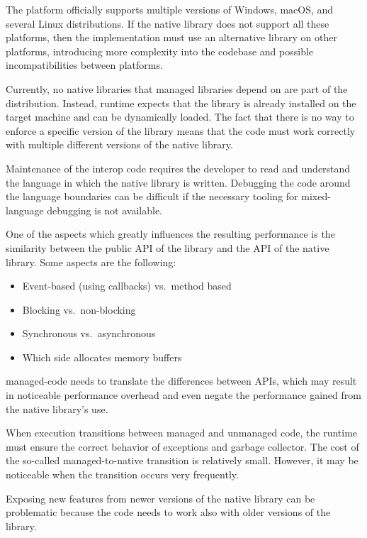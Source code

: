 \begin{itemize}

     The \dotnet{} platform officially supports
    multiple versions of Windows, macOS, and several Linux distributions. If the native library does
    not support all these platforms, then the implementation must use an alternative library on
    other platforms, introducing more complexity into the codebase and possible incompatibilities
    between platforms.

     Currently, no native libraries that managed
    \dotnet{} libraries depend on are part of the \dotnet{} distribution. Instead, \dotnet{} runtime
    expects that the library is already installed on the target machine and can be dynamically
    loaded. The fact that there is no way to enforce a specific version of the library means that
    the \dotnet{} code must work correctly with multiple different versions of the native library.

     Maintenance of the interop code requires the developer to read and
    understand the language in which the native library is written. Debugging the code around the
    language boundaries can be difficult if the necessary tooling for mixed-language debugging is
    not available.

     One of the aspects which greatly influences the resulting performance is
    the similarity between the public API of the \dotnet{} library and the API of the native
    library. Some aspects are the following:

    \begin{itemize}
      \item Event-based (using callbacks) vs.\ method based
      \item Blocking vs.\ non-blocking
      \item Synchronous vs.\ asynchronous
      \item Which side allocates memory buffers
    \end{itemize}

    \Gls{managed-code} needs to translate the differences between APIs, which may result in noticeable
    performance overhead and even negate the performance gained from the native library's use.

     When execution transitions between managed and unmanaged code,
    the runtime must ensure the correct behavior of exceptions and garbage collector. The cost of
    the so-called managed-to-native transition is relatively small. However, it may be noticeable
    when the transition occurs very frequently.

     Exposing new features from newer versions of the native library can
    be problematic because the code needs to work also with older versions of the library.

\end{itemize}

